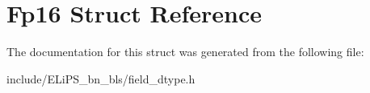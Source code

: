 \hypertarget{struct_fp16}{}\section{Fp16 Struct Reference}
\label{struct_fp16}


The documentation for this struct was generated from the following file\+:\begin{DoxyCompactItemize}
\item 
include/\+E\+Li\+P\+S\+\_\+bn\+\_\+bls/field\+\_\+dtype.\+h\end{DoxyCompactItemize}
